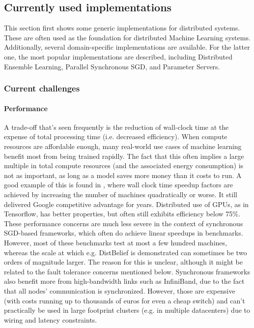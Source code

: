 









\subsection{Currently used implementations}
This section first shows some generic implementations for distributed systems. These are often used as the foundation for distributed Machine Learning systems. Additionally, several domain-specific implementations are available. For the latter one, the most popular implementations are described, including Distributed Ensemble Learning, Parallel Synchronous SGD, and Parameter Servers.



\subsubsection{Current challenges}
\paragraph{Performance}

A trade-off that’s seen frequently is the reduction of wall-clock time at the expense of total processing time (i.e. decreased efficiency). When compute resources are affordable enough, many real-world use cases of machine learning benefit most from being trained rapidly. The fact that this often implies a large multiple in total compute resources (and the associated energy consumption) is not as important, as long as a model saves more money than it costs to run.  A good example of this is found in \citet{DistBelief2012}, where wall clock time speedup factors are achieved by increasing the number of machines quadratically or worse. It still delivered Google competitive advantage for years. Distributed use of GPUs, as in Tensorflow, has better properties, but often still exhibits efficiency below 75\%.
These performance concerns are much less severe in the context of synchronous SGD-based frameworks, which often do achieve linear speedups in benchmarks. However, most of these benchmarks test at most a few hundred machines, whereas the scale at which e.g. DistBelief is demonstrated can sometimes be two orders of magnitude larger. The reason for this is unclear, although it might be related to the fault tolerance concerns mentioned below. Synchronous frameworks also benefit more from high-bandwidth links such as InfiniBand, due to the fact that all nodes' communication is synchronized. However, those are expensive (with costs running up to thousands of euros for even a cheap switch) and can't practically be used in large footprint clusters (e.g. in multiple datacenters) due to wiring and latency constraints.

